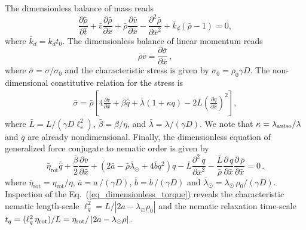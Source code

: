 The dimensionless balance of mass reads
\begin{equation}{}
	\label{eq_dimensionless_density}
	\frac{\partial \bar{\rho} }{\partial \bar{t}} + \bar{v}\frac{\partial \bar{\rho}}{\partial \bar{x}} +  \bar{\rho} \frac{\partial \bar{v}}{\partial \bar{x}} -  \frac{\partial^2 \bar{\rho}}{\partial \bar{x}^2}  + \bar{k}_d (\bar{\rho}-1)=0,
\end{equation}
where $\bar{k}_d= k_d t_0$. The dimensionless balance of linear momentum reads
\begin{equation} \label{eq_dimensionless_force}
	\bar{\rho} \bar{v} =  \frac{\partial \bar{\sigma}}{\partial \bar{x}}  \, ,
\end{equation}
where $\bar{\sigma} = \sigma / \sigma_0$ and the characteristic stress is given by $\sigma_0= \rho_0  \gamma D$. The non-dimensional constitutive relation for the stress is
\begin{align} \label{eq_dimensionless_stress}
	\bar{\sigma} = \bar{\rho} \left[   4 \frac{\partial \bar{v}}{\partial \bar{x}}+ \bar{\beta}  \bar{\hat{q}} +  \bar{\lambda} \left( 1+\kappa q \right) - 2\bar{L}  \left( \frac{\partial q}{\partial \bar{x}}\right)^2      \right],
\end{align}
where $\bar{L} = L /(\gamma D \ell_s^2) $, $\bar{\beta} = \beta / \eta$,  and $\bar{\lambda} = \lambda/(\gamma D)$. We note that $\kappa = \lambda_{\rm aniso}/\lambda$ and $q$ are already nondimensional.  Finally, the dimensionless equation of generalized force conjugate to nematic order is given by
\begin{equation}\label{eq_dimensionless_torque}
	\bar{\eta}_{\text{rot}} \bar{\hat{q}} + \frac{\bar{\beta}}{2} \frac{\partial \bar{v}}{\partial \bar{x}}+\left(2\bar{a} - \bar{\rho} \bar{\lambda}_{\odot} +4\bar{b}q^2\right)q - \bar{L} \frac{\partial^2 \, q}{\partial \bar{x}^2}  - \frac{\bar{L}}{\bar{\rho}} \frac{\partial \, q}{\partial \bar{x}} \frac{\partial \, \bar{\rho}}{\partial \bar{x}} = 0 \, .
\end{equation}
where $\bar{\eta}_{\text{rot}} =  \eta_{\text{rot}}/ \eta $,  $\bar{a} =  a\, / \left(\gamma D\right)$, $\bar{b} =  b\, / \left(\gamma D\right) $ and  $\bar{\lambda}_{\odot}=\lambda_{\odot} \,  \rho_0 / ( \gamma D)$.   Inspection of the Eq.~(\ref{eq_dimensionless_torque}) reveals the characteristic nematic length-scale $\ell_q^2={L/ \left | 2a-\lambda_{\odot}\rho_0  \right | }$  and the nematic relaxation time-scale  $t_q = (\ell_q^2 \, \eta_{\rm rot})/L = \eta_{\rm rot}/ \left | 2a-\lambda_{\odot}\rho  \right |$.



